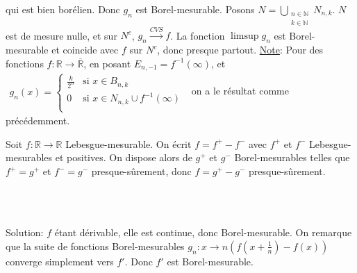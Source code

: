 \documentclass{report}
\begin{document}
  qui est bien borélien. Donc $g_n$ est Borel-mesurable.\newline
  Posons $\displaystyle N=\bigcup_{\substack{n\in \mathbb N\\ k\in \mathbb N}}N_{n,k}$. $N$ est de mesure nulle, et sur $N^c$, $g_n\xrightarrow{CVS} f$.\newline
  La fonction $\limsup g_n$ est Borel-mesurable et coincide avec $f$ sur $N^c$, donc presque partout.\newline \newline
  \underline{Note}: Pour des fonctions $f:\mathbb R\to  \overline{\mathbb R}$, en posant $E_{n,-1} = f^{-1}(\infty)$, et \newline $\begin{aligned}
  g_n(x)=
  \begin{cases}
    \frac{k}{2^n}  & \text{si }  x\in B_{n,k}\\
    0 & \text{si }  x\in N_{n,k}\cup f^{-1}(\infty) \\
  \end{cases}
\end{aligned}$\newline
on a le résultat comme précédemment.

Soit $f:\mathbb R\to \mathbb R$ Lebesgue-mesurable. On écrit $f=f^+ - f^-$ avec $f^+$ et $f^-$ Lebesgue-mesurables et positives. On dispose alors de $g^+$ et $g^-$ Borel-mesurables telles que $f^+=g^+$ et $f^-=g^-$ presque-sûrement, donc $f=g^+-g^-$ presque-sûrement. 

\subsection{} 

\subsection{} \\ \\

Solution: $f$ étant dérivable, elle est continue, donc Borel-mesurable. On remarque que la suite de fonctions Borel-mesurables $g_n:x\to n\left( f\left(x+\frac 1n\right) -f(x)\right)$ converge simplement vers $f'$. Donc $f'$ est Borel-mesurable.

\subsection{} 
\end{document}
